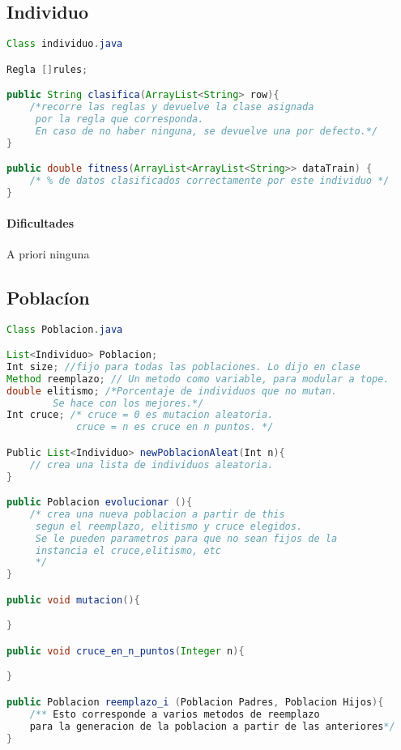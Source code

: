 \documentclass[nochap]{apuntes}
\begin{document}
\subsection{Individuo}

\begin{lstlisting}[language=Java]
Class individuo.java

Regla []rules;

public String clasifica(ArrayList<String> row){
	/*recorre las reglas y devuelve la clase asignada
	 por la regla que corresponda. 
	 En caso de no haber ninguna, se devuelve una por defecto.*/
}

public double fitness(ArrayList<ArrayList<String>> dataTrain) {
	/* % de datos clasificados correctamente por este individuo */
}

\end{lstlisting}

\paragraph*{Dificultades} A priori ninguna
\subsection{Poblacíon}

\begin{lstlisting}[language=Java]
Class Poblacion.java

List<Individuo> Poblacion;
Int size; //fijo para todas las poblaciones. Lo dijo en clase
Method reemplazo; // Un metodo como variable, para modular a tope.
double elitismo; /*Porcentaje de individuos que no mutan. 
		Se hace con los mejores.*/
Int cruce; /* cruce = 0 es mutacion aleatoria. 
			cruce = n es cruce en n puntos. */

Public List<Individuo> newPoblacionAleat(Int n){
	// crea una lista de individuos aleatoria.
}

public Poblacion evolucionar (){
	/* crea una nueva poblacion a partir de this
	 segun el reemplazo, elitismo y cruce elegidos.
	 Se le pueden parametros para que no sean fijos de la 
	 instancia el cruce,elitismo, etc
	 */
}

public void mutacion(){

}

public void cruce_en_n_puntos(Integer n){

}

public Poblacion reemplazo_i (Poblacion Padres, Poblacion Hijos){
	/** Esto corresponde a varios metodos de reemplazo
	para la generacion de la poblacion a partir de las anteriores*/
}

\end{lstlisting}
\end{document}

